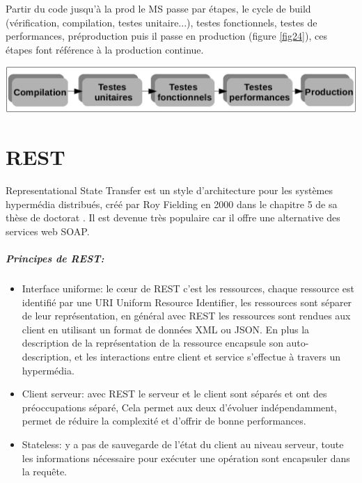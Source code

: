 \documentclass[12pt, a4paper, openany]{report}
\begin{document}
\begin{appendices}
 Partir du code jusqu'à la prod le MS passe par étapes, le cycle de build (vérification, compilation, testes unitaire...), testes fonctionnels, testes de performances, préproduction puis il passe en production (figure \ref{fig24}), ces étapes font référence à la production continue. \\
 
  \begin{center}
    \includegraphics[scale=0.35]{etape_prod_24.png}
    \label{fig24}
  \end{center} 



\chapter{REST}
  Representational State Transfer  est un style d'architecture pour les systèmes hypermédia distribués, créé par Roy Fielding en 2000 dans le chapitre 5 de sa thèse de doctorat \cite{refbibrest} . Il est devenue très populaire car il offre une alternative des services web SOAP.
  \paragraph{Principes de REST:}
  \begin{itemize}
    \item Interface uniforme: le cœur de REST c'est les ressources, chaque ressource est identifié par une URI Uniform Resource Identifier, les ressources sont séparer de leur représentation, en général avec REST les ressources sont rendues aux client en utilisant un format de données XML ou JSON. En plus la description de la représentation de la ressource encapsule son auto-description, et les interactions entre client et service s'effectue à travers un hypermédia.
    \item Client serveur: avec REST le serveur et le client sont séparés et ont des préoccupations séparé, Cela permet aux deux d'évoluer indépendamment, permet de réduire la complexité et d'offrir de bonne performances. 
    
    \item Stateless: y a pas de sauvegarde de l’état du client au niveau serveur, toute les informations nécessaire pour exécuter une opération sont encapsuler dans la requête.
    

\end{itemize}
\end{appendices}
\end{document}
